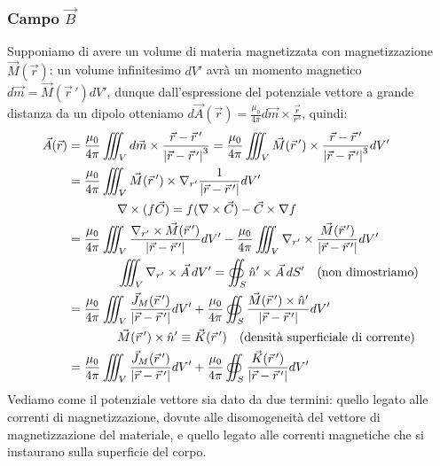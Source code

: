 \documentclass[]{article}
\begin{document}
\subsubsection{Campo $ \vec{B} $}

Supponiamo di avere un volume di materia magnetizzata con magnetizzazione $ \vec{M}(\vec{r}) $: un volume infinitesimo $ dV' $ avrà un momento magnetico $ d\vec{m} = \vec{M}(\vec{r}\,') dV' $, dunque dall'espressione del potenziale vettore a grande distanza da un dipolo otteniamo $ d\vec{A}(\vec{r}) = \frac{\mu_0}{4\pi} d\vec{m}\times \frac{\vec{r}}{r^3} $, quindi:
\begin{equation}
	\begin{split}
		\vec{A}(\vec{r}) &= \frac{\mu_0}{4\pi} \iiint_V d\vec{m} \times \frac{\vec{r}-\vec{r}\,'}{\left\lvert\vec{r}-\vec{r}\,'\right\rvert^3} = \frac{\mu_0}{4\pi} \iiint_V \vec{M}(\vec{r}\,') \times \frac{\vec{r}-\vec{r}\,'}{\left\lvert\vec{r}-\vec{r}\,'\right\rvert^3} dV' \\ 
				 &= \frac{\mu_0}{4\pi} \iiint_V \vec{M}(\vec{r}\,') \times \nabla_{r'} \frac{1}{\left\lvert\vec{r}-\vec{r}\,'\right\rvert} dV' \\ 
				 & \qquad\qquad \nabla\times(f\vec{C}) = f(\nabla\times\vec{C}) - \vec{C}\times\nabla f \\ 
				 &= \frac{\mu_0}{4\pi} \iiint_V \frac{\nabla_{r'}\times\vec{M}(\vec{r}\,')}{\left\lvert\vec{r}-\vec{r}\,'\right\rvert} dV' - \frac{\mu_0}{4\pi} \iiint_V \nabla_{r'} \times \frac{\vec{M}(\vec{r}\,')}{\left\lvert\vec{r}-\vec{r}\,'\right\rvert} dV' \\ 
				 & \qquad\qquad \iiint_V \nabla_{r'}\times\vec{A} \,dV' = \oiint_S \hat{n}' \times\vec{A} \,dS' \quad (\text{non dimostriamo}) \\ 
				 &= \frac{\mu_0}{4\pi} \iiint_V \frac{\vec{J}_M(\vec{r}\,')}{\left\lvert\vec{r}-\vec{r}\,'\right\rvert} dV' + \frac{\mu_0}{4\pi} \oiint_S \frac{\vec{M}(\vec{r}\,') \times \hat{n}'}{\left\lvert\vec{r}-\vec{r}\,'\right\rvert} dV' \\ 
				 & \qquad\qquad \vec{M}(\vec{r}\,') \times \hat{n}' \equiv \vec{K}(\vec{r}\,') \quad (\text{densità superficiale di corrente}) \\ 
				 &= \frac{\mu_0}{4\pi} \iiint_V \frac{\vec{J}_M(\vec{r}\,')}{\left\lvert\vec{r}-\vec{r}\,'\right\rvert} dV' + \frac{\mu_0}{4\pi} \oiint_S \frac{\vec{K}(\vec{r}\,')}{\left\lvert\vec{r}-\vec{r}\,'\right\rvert} dV'
	\end{split}
	\label{eq:14}
\end{equation}
Vediamo come il potenziale vettore sia dato da due termini: quello legato alle correnti di magnetizzazione, dovute alle disomogeneità del vettore di magnetizzazione del materiale, e quello legato alle correnti magnetiche che si instaurano sulla superficie del corpo.
\end{document}
